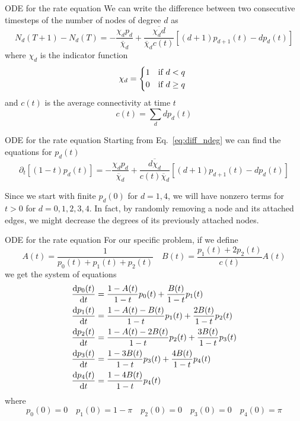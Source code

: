 \documentclass[handout]{beamer}
\begin{document}
\begin{frame}{ODE for the rate equation}
    We can write the difference between two consecutive timesteps of the number
    of nodes of degree $d$ as
    \begin{equation}
        N_d(T+1) - N_d(T) =
        - \frac{\chi_d p_d}{\overline \chi_d}
        + \frac{\overline{\chi_d d}}{\overline \chi_d c(t)}
        [(d+1) p_{d+1}(t) - dp_d(t)]
        \label{eq:diff_ndeg}
    \end{equation}
    where $\chi_d$ is the \alert{indicator function}
    \begin{equation}
        \chi_d =
        \begin{cases*}
            1 & if $d<q$\\
            0 & if $d\geq q$
        \end{cases*}
        \label{eq:indfunc}
    \end{equation}
    and $c(t)$ is the average connectivity at time $t$
    \begin{equation}
        c(t) = \sum_d d p_d(t)
        \label{eq:avgcon}
    \end{equation}
\end{frame}

\begin{frame}{ODE for the rate equation}
    Starting from Eq.~\ref{eq:diff_ndeg} we can find the equations for $p_d(t)$
    \begin{equation}
        \partial_t[(1-t) p_d(t)] = - \frac{\chi_d p_d}{\overline \chi_d}
        + \frac{\overline{d \chi_d}}{c(t) \overline \chi_d}
        [(d+1) p_{d+1}(t) - d p_d(t)]
        \label{eq:wormwald_ode}
    \end{equation}
    
    Since we \alert{start} with finite $p_d(0)$ for $d=1,4$, we will have
    nonzero terms for $t>0$ for $d=0,1,2,3,4$. In fact, by randomly removing a
    node and its attached edges, we might decrease the degrees of its previously
    attached nodes.
\end{frame}

\begin{frame}{ODE for the rate equation}
    For our specific problem, if we define
    $$
    A(t) = \frac{1}{p_0(t) + p_1(t) + p_2(t)}
    \quad B(t) = \frac{p_1(t) + 2 p_2(t)}{c(t)} A(t)
    $$
    we get the system of equations
    {\scriptsize
    \begin{align*}
        \dv{p_0(t)}{t} &= \frac{1-A(t)}{1-t} p_0(t) + \frac{B(t)}{1-t} p_1(t)\\
        \dv{p_1(t)}{t} &= \frac{1-A(t)-B(t)}{1-t} p_1(t) + \frac{2B(t)}{1-t} p_2(t)\\
        \dv{p_2(t)}{t} &= \frac{1-A(t)-2B(t)}{1-t} p_2(t) + \frac{3B(t)}{1-t}
        p_3(t)\\
        \dv{p_3(t)}{t} &= \frac{1-3B(t)}{1-t} p_3(t) + \frac{4B(t)}{1-t} p_4(t)\\
        \dv{p_4(t)}{t} &= \frac{1-4B(t)}{1-t} p_4(t)
    \end{align*}
    where
    $$
    p_0(0) = 0 \quad p_1(0) = 1-\pi \quad p_2(0)=0 \quad p_3(0)=0 \quad
    p_4(0)=\pi
    $$
    }
\end{frame}
\end{document}
